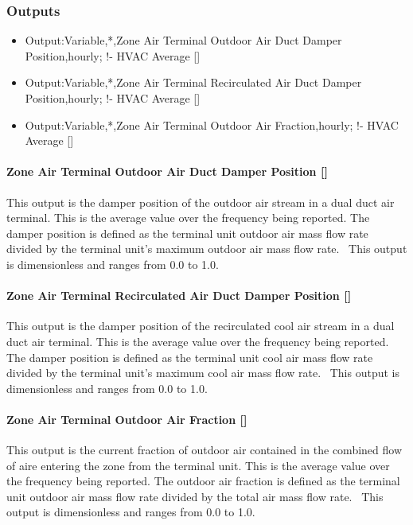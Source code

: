 \subsubsection{Outputs}\label{outputs-14}

\begin{itemize}
\item
  Output:Variable,*,Zone Air Terminal Outdoor Air Duct Damper Position,hourly; !- HVAC Average {[]}
\item
  Output:Variable,*,Zone Air Terminal Recirculated Air Duct Damper Position,hourly; !- HVAC Average {[]}
\item
  Output:Variable,*,Zone Air Terminal Outdoor Air Fraction,hourly; !- HVAC Average {[]}
\end{itemize}

\paragraph{Zone Air Terminal Outdoor Air Duct Damper Position {[]}}\label{zone-air-terminal-outdoor-air-duct-damper-position}

This output is the damper position of the outdoor air stream in a dual duct air terminal. This is the average value over the frequency being reported. The damper position is defined as the terminal unit outdoor air mass flow rate divided by the terminal unit's maximum outdoor air mass flow rate.~ This output is dimensionless and ranges from 0.0 to 1.0.

\paragraph{Zone Air Terminal Recirculated Air Duct Damper Position {[]}}\label{zone-air-terminal-recirculated-air-duct-damper-position}

This output is the damper position of the recirculated cool air stream in a dual duct air terminal. This is the average value over the frequency being reported. The damper position is defined as the terminal unit cool air mass flow rate divided by the terminal unit's maximum cool air mass flow rate.~ This output is dimensionless and ranges from 0.0 to 1.0.

\paragraph{Zone Air Terminal Outdoor Air Fraction {[]}}\label{zone-air-terminal-outdoor-air-fraction}

This output is the current fraction of outdoor air contained in the combined flow of aire entering the zone from the terminal unit. This is the average value over the frequency being reported. The outdoor air fraction is defined as the terminal unit outdoor air mass flow rate divided by the total air mass flow rate.~ This output is dimensionless and ranges from 0.0 to 1.0.
